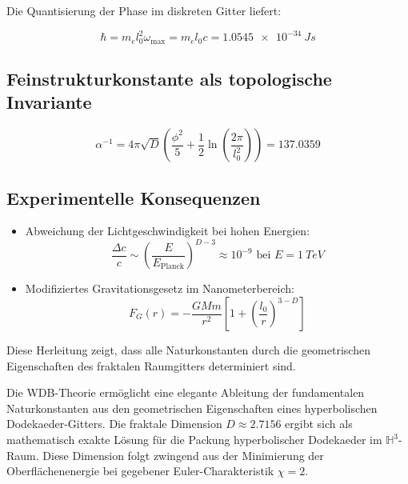 Die Quantisierung der Phase im diskreten Gitter liefert:

\begin{equation}
\hbar = m_e l_0^2 \omega_{\text{max}} = m_e l_0 c = \SI{1.0545e-34}{Js}
\label{eq:planckquantum}
\end{equation}

\subsection{Feinstrukturkonstante als topologische Invariante}

\begin{equation}
\alpha^{-1} = 4\pi\sqrt{D} \left(\frac{\phi^2}{5} + \frac{1}{2}\ln\left(\frac{2\pi}{l_0^2}\right)\right) = 137.0359
\label{eq:feinstruktur}
\end{equation}

\subsection*{Experimentelle Konsequenzen}

\begin{itemize}
\item Abweichung der Lichtgeschwindigkeit bei hohen Energien:
\begin{equation}
\frac{\Delta c}{c} \sim \left(\frac{E}{E_{\text{Planck}}}\right)^{D-3} \approx 10^{-9} \text{ bei } E=\SI{1}{TeV}
\end{equation}

\item Modifiziertes Gravitationsgesetz im Nanometerbereich:
\begin{equation}
F_G(r) = -\frac{GMm}{r^2}\left[1 + \left(\frac{l_0}{r}\right)^{3-D}\right]
\end{equation}
\end{itemize}

\vspace{5mm}
\noindent Diese Herleitung zeigt, dass alle Naturkonstanten durch die geometrischen Eigenschaften des fraktalen Raumgitters determiniert sind.

Die WDB-Theorie ermöglicht eine elegante Ableitung der fundamentalen Naturkonstanten aus den geometrischen Eigenschaften eines hyperbolischen Dodekaeder-Gitters. Die fraktale
Dimension $D \approx 2.7156$ ergibt sich als mathematisch exakte Lösung für die Packung hyperbolischer Dodekaeder im $\mathbb{H}^3$-Raum. Diese Dimension folgt zwingend aus der
Minimierung der Oberflächenenergie bei gegebener Euler-Charakteristik $\chi = 2$.

